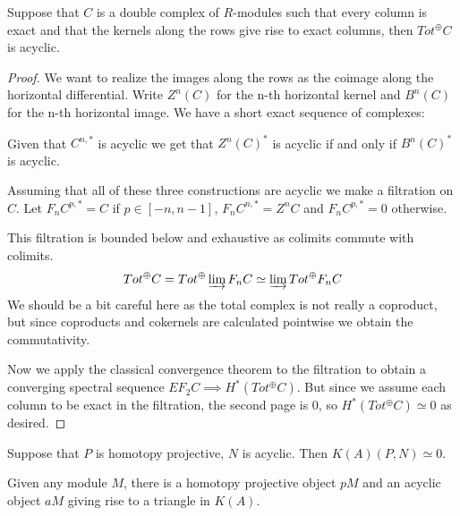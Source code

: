 \documentclass[../thesis.tex]{subfiles}
\begin{document}
            \begin{corollary}\label{cor: ac-as-2}
                Suppose that $C$ is a double complex of $R$-modules such that every column is exact and that the kernels along the rows give rise to exact columns, then $Tot^\oplus C$ is acyclic.
            \end{corollary}

            \begin{proof}
                We want to realize the images along the rows as the coimage along the horizontal differential. Write $Z^n(C)$ for the n-th horizontal kernel and $B^n(C)$ for the n-th horizontal image. We have a short exact sequence of complexes:

                \begin{center}
                \end{center}

                Given that $C^{n,*}$ is acyclic we get that $Z^n(C)^*$ is acyclic if and only if $B^n(C)^*$ is acyclic.

                Assuming that all of these three constructions are acyclic we make a filtration on $C$. Let $F_nC^{p,*} = C$ if $p \in [-n, n-1]$, $F_nC^{n,*} = Z^nC$ and $F_nC^{p,*} = 0$ otherwise.

                This filtration is bounded below and exhaustive as colimits commute with colimits.
                \begin{align*}
                    Tot^\oplus C = Tot^\oplus \varinjlim F_nC \simeq \varinjlim Tot^\oplus F_nC
                \end{align*}
                We should be a bit careful here as the total complex is not really a coproduct, but since coproducts and cokernels are calculated pointwise we obtain the commutativity.

                Now we apply the classical convergence theorem to the filtration to obtain a converging spectral sequence $EF_2C \implies H^*(Tot^\oplus C)$. But since we assume each column to be exact in the filtration, the second page is $0$, so $H^*(Tot^\oplus C) \simeq 0$ as desired. 
            \end{proof}

            \begin{thm}
                Suppose that $P$ is homotopy projective, $N$ is acyclic. Then $K(A)(P, N)\simeq 0$.

                Given any module $M$, there is a homotopy projective object $pM$ and an acyclic object $aM$ giving rise to a triangle in $K(A)$.
                \begin{center}
                \end{center}
            \end{thm}
\end{document}
